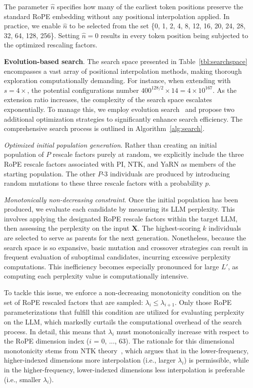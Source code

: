 The parameter $\hat{n}$ specifies how many of the earliest token positions preserve the standard RoPE embedding without any positional interpolation applied. In practice, we enable $\hat{n}$ to be selected from the set \{0, 1, 2, 4, 8, 12, 16, 20, 24, 28, 32, 64, 128, 256\}. Setting $\hat{n}=0$ results in every token position being subjected to the optimized rescaling factors.

\textbf{Evolution-based search}. The search space presented in Table~\ref{tbl:searchspace} encompasses a vast array of positional interpolation methods, making thorough exploration computationally demanding. For instance, when extending with $s=4\times$, the potential configurations number $400^{128/2}\times14=4\times10^{167}$. As the extension ratio increases, the complexity of the search space escalates exponentially. To manage this, we employ evolution search~\cite{guo2020single} and propose two additional optimization strategies to significantly enhance search efficiency. The comprehensive search process is outlined in Algorithm~\ref{alg:search}.

\textit{Optimized initial population generation}. Rather than creating an initial population of $P$ rescale factors purely at random, we explicitly include the three RoPE rescale factors associated with PI, NTK, and YaRN as members of the starting population. The other $P$-3 individuals are produced by introducing random mutations to these three rescale factors with a probability $p$.

\textit{Monotonically non-decreasing constraint}. Once the initial population has been produced, we evaluate each candidate by measuring its LLM perplexity. This involves applying the designated RoPE rescale factors within the target LLM, then assessing the perplexity on the input $\mathbf{X}$. The highest-scoring $k$ individuals are selected to serve as parents for the next generation. Nonetheless, because the search space is so expansive, basic mutation and crossover strategies can result in frequent evaluation of suboptimal candidates, incurring excessive perplexity computations. This inefficiency becomes especially pronounced for large $L'$, as computing each perplexity value is computationally intensive.

To tackle this issue, we enforce a non-decreasing monotonicity condition on the set of RoPE rescaled factors that are sampled: $\lambda_i \le \lambda_{i+1}$. Only those RoPE parameterizations that fulfill this condition are utilized for evaluating perplexity on the LLM, which markedly curtails the computational overhead of the search process. In detail, this means that $\lambda_i$ must monotonically increase with respect to the RoPE dimension index ($i$ = 0, ..., 63). The rationale for this dimensional monotonicity stems from NTK theory~\cite{jacot2018neural,tancik2020fourier,ntk}, which argues that in the lower-frequency, higher-indexed dimensions more interpolation (i.e., larger $\lambda_i$) is permissible, while in the higher-frequency, lower-indexed dimensions less interpolation is preferable (i.e., smaller $\lambda_i$).

